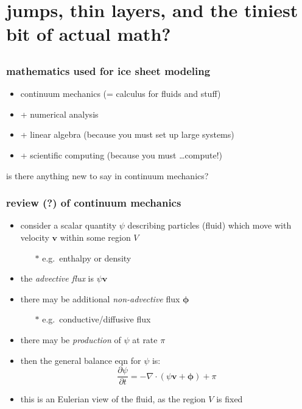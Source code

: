 \documentclass{beamer}
\begin{document}
\section[jumps and layers]{jumps, thin layers, and the tiniest bit of actual math?}\subsection*{}


\begin{frame}
  \frametitle{mathematics used for ice sheet modeling}
\begin{itemize}
\item continuum mechanics (= calculus for fluids and stuff)
\item + numerical analysis
\item + linear algebra (because you must set up large systems)
\item + scientific computing (because you must \dots compute!)
\end{itemize}

\bigskip\bigskip
\begin{center}
\alert{is there anything new to say in continuum mechanics?}
\end{center}
\end{frame}



\begin{frame}
  \frametitle{review (?) of continuum mechanics}

\begin{itemize}
\item consider a scalar quantity $\psi$ describing particles (fluid) which move with velocity $\mathbf{v}$ within some region $V$
  \begin{itemize}
  \item[$\ast$] e.g.~enthalpy or density
  \end{itemize}
\item the \emph{advective flux} is $\psi \mathbf{v}$
\item there may be additional \emph{non-advective} flux $\boldsymbol{\phi}$
  \begin{itemize}
  \item[$\ast$] e.g.~conductive/diffusive flux
  \end{itemize}
\item there may be \emph{production} of $\psi$ at rate $\pi$
\item then the \alert{general balance eqn} for $\psi$ is:
\begin{equation*}
  \frac{\partial \psi}{\partial t} = - \nabla \cdot \left(\psi \mathbf{v} + \boldsymbol{\phi} \right) + \pi
\end{equation*}
\item this is an Eulerian view of the fluid, as the region $V$ is fixed
\end{itemize}
\end{frame}
\end{document}
